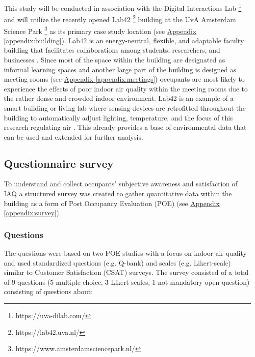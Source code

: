 This study will be conducted in association with the Digital Interactions Lab \footnote{https://uva-dilab.com/} and will utilize the recently opened Lab42 \footnote{https://lab42.uva.nl/} building at the UvA Amsterdam Science Park \footnote{https://www.amsterdamsciencepark.nl/} as its primary case study location (see \hyperref[appendix:building]{Appendix \ref*{appendix:building}}). Lab42 is an energy-neutral, flexible, and adaptable faculty building that facilitates collaborations among students, researchers, and businesses \cite{benthem_2022}. Since most of the space within the building are designated as informal learning spaces and another large part of the building is designed as meeting rooms (see \hyperref[appendix:meetings]{Appendix \ref*{appendix:meetings}}) occupants are most likely to experience the effects of poor indoor air quality within the meeting rooms due to the rather dense and crowded indoor environment. Lab42 is an example of a smart building or living lab where sensing devices are retrofitted throughout the building to automatically adjust lighting, temperature, and the focus of this research regulating air \cite{architects_lab42_2022}. This already provides a base of environmental data that can be used and extended for further analysis. 


\subsection{Questionnaire survey}
\label{sec:questionnaire}

To understand and collect occupants' subjective awareness and satisfaction of IAQ a structured survey was created to gather quantitative data within the building as a form of Post Occupancy Evaluation (POE) (see \hyperref[appendix:survey]{Appendix \ref*{appendix:survey}}).


\subsubsection{Questions}
The questions were based on two POE studies with a focus on indoor air quality \cite{silva_post-occupancy_2017, son_perceived_2023} and used standardized questions (e.g. Q-bank) and scales (e.g. Likert-scale) similar to Customer Satisfaction (CSAT) surveys. The survey consisted of a total of 9 questions (5 multiple choice, 3 Likert scales, 1 not mandatory open question) consisting of questions about:

